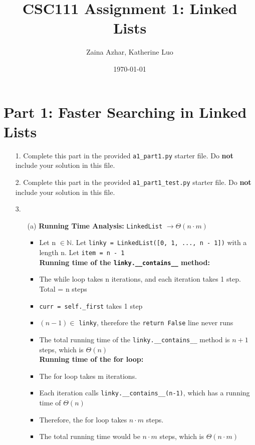 \documentclass[fontsize=11pt]{article}
\title{CSC111 Assignment 1: Linked Lists}
\author{Zaina Azhar, Katherine Luo}
\date{\today}
\begin{document}
\maketitle

\section*{Part 1: Faster Searching in Linked Lists}

\begin{enumerate}

\item[1.]
Complete this part in the provided \texttt{a1\_part1.py} starter file.
Do \textbf{not} include your solution in this file.

\item[2.]
Complete this part in the provided \texttt{a1\_part1\_test.py} starter file.
Do \textbf{not} include your solution in this file.

\item[3.]
\begin{enumerate}

    \item[(a)]
    \textbf{Running Time Analysis:} \texttt{LinkedList} $\rightarrow\Theta(n \cdot m)$\\
    \begin{itemize}
        \item Let n $\in \mathbb{N}$. Let \texttt{linky = LinkedList([0, 1, ..., n - 1])} with a length n. Let \texttt{item = n - 1}\\
        
        \textbf{Running time of the \texttt{linky.\_\_contains\_\_} method:} 
        \item The while loop takes n iterations, and each iteration takes 1 step. Total = n steps
        \item \texttt{curr = self.\_first} takes 1 step
        \item $(n-1) \in$ \texttt{linky}, therefore the \texttt{return False} line never runs
        \item The total running time of the \texttt{linky.\_\_contains\_\_} method is $n + 1$ steps, which is $\Theta(n)$\\
        
        \textbf{Running time of the for loop:}
        \item The for loop takes m iterations. 
        \item Each iteration calls \texttt{linky.\_\_contains\_\_(n-1)}, which has a running time of $\Theta(n)$
        \item Therefore, the for loop takes $n \cdot m$ steps.
        \item The total running time would be $n \cdot m$ steps, which is $\Theta(n \cdot m)$\\
    \end{itemize}


\end{enumerate}
\end{enumerate}
\end{document}
